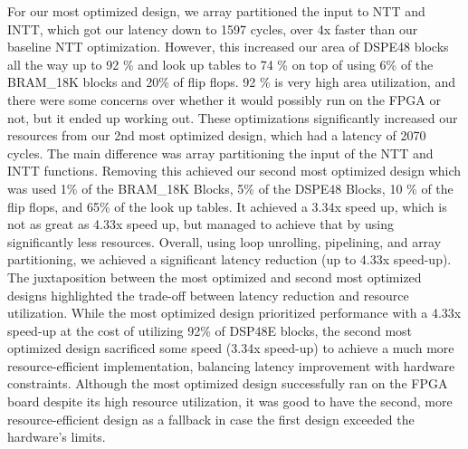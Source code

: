   For our most optimized design, we array partitioned the input to NTT and INTT, which got our latency down to 1597 cycles, over 4x faster than our baseline NTT optimization. However, this increased our area of DSPE48 blocks all the way up to 92 \% and look up tables to 74 \% on top of using 6\% of the BRAM\_18K blocks and 20\% of flip flops. 92 \% is very high area utilization, and there were some concerns over whether it would possibly run on the FPGA or not, but it ended up working out. These optimizations significantly increased our resources from our 2nd most optimized design, which had a latency of 2070 cycles. The main difference was array partitioning the input of the NTT and INTT functions. Removing this achieved our second most optimized design which was used 1\% of the BRAM\_18K Blocks, 5\% of the DSPE48 Blocks, 10 \% of the flip flops, and  65\% of the look up tables. It achieved a 3.34x speed up, which is not as great as 4.33x speed up, but managed to achieve that by using significantly less resources.
  Overall, using loop unrolling, pipelining, and array partitioning, we achieved a significant latency reduction (up to 4.33x speed-up). The juxtaposition between the most optimized and second most optimized designs highlighted the trade-off between latency reduction and resource utilization. While the most optimized design prioritized performance with a 4.33x speed-up at the cost of utilizing 92\% of DSP48E blocks, the second most optimized design sacrificed some speed (3.34x speed-up) to achieve a much more resource-efficient implementation, balancing latency improvement with hardware constraints. Although the most optimized design successfully ran on the FPGA board despite its high resource utilization, it was good to have the second, more resource-efficient design as a fallback in case the first design exceeded the hardware's limits.











